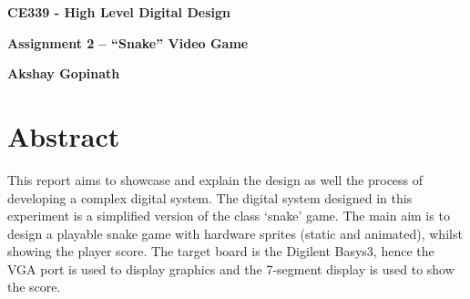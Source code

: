 \documentclass[aps, secnumarabic, balancelastpage, asmath, amssymb, nofootinbib, floatfix,]{revtex4-2}
\begin{document}


\thispagestyle{plain}
\begin{center}
    \Large
    \textbf{CE339 - High Level Digital Design}
        
    \vspace{0.4cm}
    \large
    \textbf{Assignment 2 -- ``Snake'' Video Game}
        
    \vspace{0.4cm}
    \textbf{Akshay Gopinath}
       
    \section*{Abstract}
    \fontsize{11pt}{12pt}\selectfont
    
\end{center}
\fontsize{11pt}{12pt}\selectfont
{
\setlength{\parindent}{0pt}


This report aims to showcase and explain the design as well the process of developing a complex digital system. The digital system designed in this experiment is a simplified version of the class `snake' game. The main aim is to design a playable snake game with hardware sprites (static and animated), whilst showing the player score. The target board is the Digilent Basys3, hence the VGA port is used to display graphics and the 7-segment display is used to show the score.

}

\clearpage
\end{document}
